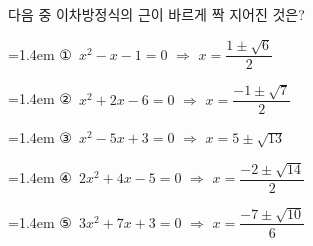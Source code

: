 다음 중 이차방정식의 근이 바르게 짝 지어진 것은?
\par\medskip\par\noindent\hangindent=1.4em {\small ①}\ $x^2-x-1=0$ $\Rightarrow$ $x=\dfrac{1\pm\sqrt{6}}{2}$\par\noindent\hangindent=1.4em {\small ②}\ $x^2+2x-6=0$ $\Rightarrow$ $x=\dfrac{-1\pm\sqrt{7}}{2}$\par\noindent\hangindent=1.4em {\small ③}\ $x^2-5x+3=0$ $\Rightarrow$ $x=5\pm\sqrt{13}$\par\noindent\hangindent=1.4em {\small ④}\ $2x^2+4x-5=0$ $\Rightarrow$ $x=\dfrac{-2\pm\sqrt{14}}{2}$\par\noindent\hangindent=1.4em {\small ⑤}\ $3x^2+7x+3=0$ $\Rightarrow$ $x=\dfrac{-7\pm\sqrt{10}}{6}$\par\medskip
